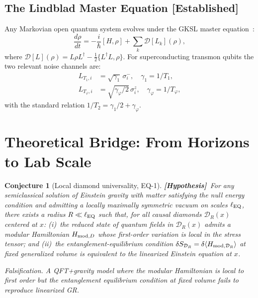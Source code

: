 \documentclass[12pt]{article}
\newtheorem{conjecture}{Conjecture}
\newcommand{\established}{\textbf{[Established]}}
\newcommand{\hypothesis}{\textbf{[Hypothesis]}}
\begin{document}
\subsection{The Lindblad Master Equation \established}

Any Markovian open quantum system evolves under the GKSL master
equation~\cite{Lindblad1976,GKS1976}:
\begin{equation}
\frac{d\rho}{dt} = -\frac{i}{\hbar}[H,\rho]
+ \sum_k \mathcal{D}[L_k](\rho),
\label{eq:Lindblad}
\end{equation}
where $\mathcal{D}[L](\rho) = L\rho L^\dagger - \tfrac{1}{2}\{L^\dagger L,\rho\}$.
For superconducting transmon qubits the two relevant noise channels are:
\begin{align}
L_{T_1,i} &= \sqrt{\gamma_1}\,\sigma_i^-, \quad \gamma_1 = 1/T_1,\\
L_{T_\varphi,i} &= \sqrt{\gamma_\varphi/2}\,\sigma_i^z, \quad \gamma_\varphi = 1/T_\varphi,
\end{align}
with the standard relation $1/T_2 = \gamma_1/2 + \gamma_\varphi$.

\section{Theoretical Bridge: From Horizons to Lab Scale}
\label{sec:bridge}

\begin{conjecture}[Local diamond universality, EQ-1]
\label{conj:EQ1}
\hypothesis\ For any semiclassical solution of Einstein gravity with matter satisfying
the null energy condition and admitting a locally maximally symmetric vacuum on scales
$\ell_{\rm EQ}$, there exists a radius $R \ll \ell_{\rm EQ}$ such that, for all causal
diamonds $\mathcal{D}_R(x)$ centered at $x$: (i)~the reduced state of quantum fields
in $\mathcal{D}_R(x)$ admits a modular Hamiltonian $H_{{\rm mod},D}$ whose first-order
variation is local in the stress tensor; and (ii)~the entanglement-equilibrium condition
$\delta S_{\mathcal{D}_R} = \delta\langle H_{{\rm mod},\mathcal{D}_R}\rangle$ at fixed
generalized volume is equivalent to the linearized Einstein equation at $x$.

\noindent\textit{Falsification.} A QFT+gravity model where the modular Hamiltonian
is local to first order but the entanglement equilibrium condition at fixed volume fails
to reproduce linearized GR.
\end{conjecture}
\end{document}
